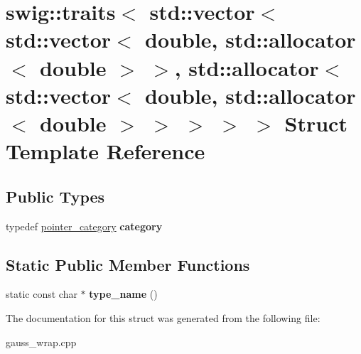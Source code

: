 \hypertarget{structswig_1_1traits_3_01std_1_1vector_3_01std_1_1vector_3_01double_00_01std_1_1allocator_3_01do0ee7f897e52057e694afb5f2c7e4331f}{\section{swig\-:\-:traits$<$ std\-:\-:vector$<$ std\-:\-:vector$<$ double, std\-:\-:allocator$<$ double $>$ $>$, std\-:\-:allocator$<$ std\-:\-:vector$<$ double, std\-:\-:allocator$<$ double $>$ $>$ $>$ $>$ $>$ Struct Template Reference}
\label{structswig_1_1traits_3_01std_1_1vector_3_01std_1_1vector_3_01double_00_01std_1_1allocator_3_01do0ee7f897e52057e694afb5f2c7e4331f}
}
\subsection*{Public Types}
\begin{DoxyCompactItemize}
\item 
\hypertarget{structswig_1_1traits_3_01std_1_1vector_3_01std_1_1vector_3_01double_00_01std_1_1allocator_3_01do0ee7f897e52057e694afb5f2c7e4331f_a1e0db52b2862e4f593c39a954f8d0c25}{typedef \hyperlink{structswig_1_1pointer__category}{pointer\-\_\-category} {\bfseries category}}\label{structswig_1_1traits_3_01std_1_1vector_3_01std_1_1vector_3_01double_00_01std_1_1allocator_3_01do0ee7f897e52057e694afb5f2c7e4331f_a1e0db52b2862e4f593c39a954f8d0c25}

\end{DoxyCompactItemize}
\subsection*{Static Public Member Functions}
\begin{DoxyCompactItemize}
\item 
\hypertarget{structswig_1_1traits_3_01std_1_1vector_3_01std_1_1vector_3_01double_00_01std_1_1allocator_3_01do0ee7f897e52057e694afb5f2c7e4331f_a4d2c5bcef6ff40ad05eb230d28af0a66}{static const char $\ast$ {\bfseries type\-\_\-name} ()}\label{structswig_1_1traits_3_01std_1_1vector_3_01std_1_1vector_3_01double_00_01std_1_1allocator_3_01do0ee7f897e52057e694afb5f2c7e4331f_a4d2c5bcef6ff40ad05eb230d28af0a66}

\end{DoxyCompactItemize}


The documentation for this struct was generated from the following file\-:\begin{DoxyCompactItemize}
\item 
gauss\-\_\-wrap.\-cpp\end{DoxyCompactItemize}
